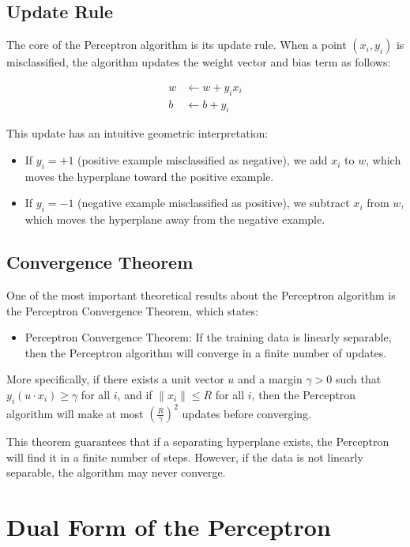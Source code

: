 \documentclass{article}
\begin{document}
\subsection{Update Rule}

The core of the Perceptron algorithm is its update rule. When a point $(x_i, y_i)$ is misclassified, the algorithm updates the weight vector and bias term as follows:

\begin{align}
w &\gets w + y_i x_i \\
b &\gets b + y_i
\end{align}

This update has an intuitive geometric interpretation:
\begin{itemize}
    \item If $y_i = +1$ (positive example misclassified as negative), we add $x_i$ to $w$, which moves the hyperplane toward the positive example.
    \item If $y_i = -1$ (negative example misclassified as positive), we subtract $x_i$ from $w$, which moves the hyperplane away from the negative example.
\end{itemize}

\subsection{Convergence Theorem}

One of the most important theoretical results about the Perceptron algorithm is the Perceptron Convergence Theorem, which states:

\begin{itemize}
    \item Perceptron Convergence Theorem: If the training data is linearly separable, then the Perceptron algorithm will converge in a finite number of updates.
\end{itemize}

More specifically, if there exists a unit vector $u$ and a margin $\gamma > 0$ such that $y_i(u \cdot x_i) \geq \gamma$ for all $i$, and if $\|x_i\| \leq R$ for all $i$, then the Perceptron algorithm will make at most $\left(\frac{R}{\gamma}\right)^2$ updates before converging.

This theorem guarantees that if a separating hyperplane exists, the Perceptron will find it in a finite number of steps. However, if the data is not linearly separable, the algorithm may never converge.

\section{Dual Form of the Perceptron}
\end{document}
